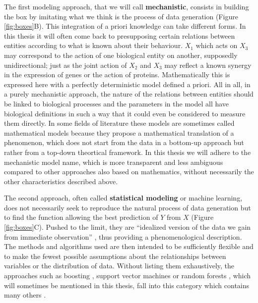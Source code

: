 \documentclass[a4paper,12pt,twoside,onecolumn,openright,final,oldfontcommands]{memoir}
\begin{document}
The first modeling approach, that we will call \textbf{mechanistic},
consists in building the box by imitating what we think is the process
of data generation (Figure \ref{fig:boxes}B). This integration of a
priori knowledge can take different forms. In this thesis it will often
come back to presupposing certain relations between entities according
to what is known about their behaviour. \(X_1\) which acts on \(X_3\)
may correspond to the action of one biological entity on another,
supposedly unidirectional; just as the joint action of \(X_2\) and
\(X_3\) may reflect a known synergy in the expression of genes or the
action of proteins. Mathematically this is expressed here with a
perfectly deterministic model defined a priori. All in all, in a purely
mechanistic approach, the nature of the relations between entities
should be linked to biological processes and the parameters in the model
all have biological definitions in such a way that it could even be
considered to measure them directly. In some fields of literature these
models are sometimes called mathematical models because they propose a
mathematical translation of a phenomenon, which does not start from the
data in a bottom-up approach but rather from a top-down theortical
framework. In this thesis we will adhere to the mechanistic model name,
which is more transparent and less ambiguous compared to other
approaches also based on mathematics, without necessarily the other
characteristics described above.

The second approach, often called \textbf{statistical modeling} or
machine learning, does not necessarily seek to reproduce the natural
process of data generation but to find the function allowing the best
prediction of \(Y\) from \(X\) (Figure \ref{fig:boxes}C). Pushed to the
limit, they are ``idealized version of the data we gain from immediate
observation'' \citep{frigg2020models}, thus providing a phenomenological
description. The methods and algorithms used are then intended to be
sufficiently flexible and to make the fewest possible assumptions about
the relationships between variables or the distribution of data. Without
listing them exhaustively, the approaches such as boosting
\citep{buhlmann2007boosting}, support vector machines
\citep{cortes1995support} or random forests \citep{breiman2001random},
which will sometimes be mentioned in this thesis, fall into this
category which contains many others \citep{hastie2009elements}.
\end{document}

